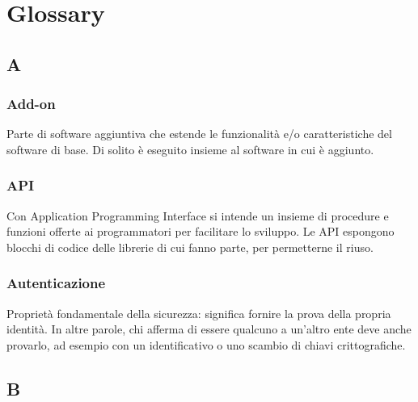 \section{Glossary}

\subsection*{A}

\subsubsection*{Add-on}
Parte di software aggiuntiva che estende le funzionalità e/o caratteristiche del software di base. Di solito è eseguito insieme al software in cui è aggiunto.

\subsubsection*{API}
Con Application Programming Interface si intende un insieme di procedure e funzioni offerte ai programmatori per facilitare lo sviluppo. Le API espongono blocchi di codice delle librerie di cui fanno parte, per permetterne il riuso.

\subsubsection*{Autenticazione}
Proprietà fondamentale della sicurezza: significa fornire la prova della propria identità. In altre parole, chi afferma di essere qualcuno a un'altro ente deve anche provarlo, ad esempio con un identificativo o uno scambio di chiavi crittografiche.

\subsection*{B}

